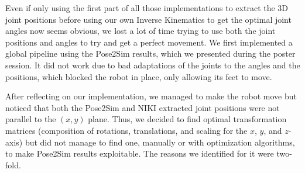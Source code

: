 \documentclass{amsart}
\theoremstyle{definition}
\theoremstyle{plain}
\begin{document}
Even if only using the first part of all those implementations to extract the 3D joint positions before using our own Inverse Kinematics to get the optimal joint angles now seems obvious, we lost a lot of time trying to use both the joint positions and angles to try and get a perfect movement. We first implemented a global pipeline using the Pose2Sim results, which we presented during the poster session. It did not work due to bad adaptations of the joints to the angles and the positions, which blocked the robot in place, only allowing its feet to move. 

After reflecting on our implementation, we managed to make the robot move but noticed that both the Pose2Sim and NIKI extracted joint positions were not parallel to the $(x, y)$ plane. Thus, we decided to find optimal transformation matrices (composition of rotations, translations, and scaling for the $x$, $y$, and $z$-axis) but did not manage to find one, manually or with optimization algorithms, to make Pose2Sim results exploitable. The reasons we identified for it were two-fold.
\end{document}

